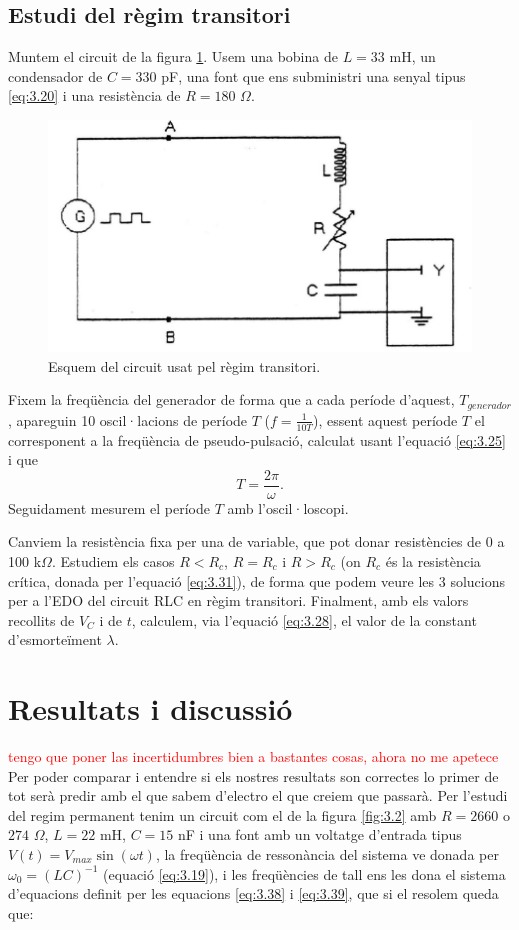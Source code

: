 \documentclass[a4paper,10.5pt]{report}
\begin{document}
\subsection{Estudi del règim transitori} \label{sec 3.2.2}
Muntem el circuit de la figura \ref{fig:3.3}. Usem una bobina de $L = 33$ mH, un condensador de $C = 330$ pF, una font que ens subministri una senyal tipus \eqref{eq:3.20} i una resistència de $R = 180$ $\Omega$.

\begin{figure}[h]
	\centering
	\includegraphics[width=0.3\linewidth]{screenshot006}
	\caption{Esquem del circuit usat pel règim transitori.}
	\label{fig:3.3}
\end{figure}

Fixem la freqüència del generador de forma que a cada període d'aquest, $T_{generador}$, apareguin 10 oscil·lacions de període $T$ ($f = \frac{1}{10T}$), essent aquest període $T$ el corresponent a la freqüència de pseudo-pulsació, calculat usant l'equació \eqref{eq:3.25} i que
\begin{equation}
	T = \frac{2\pi}{\omega}.
\end{equation}
Seguidament mesurem el període $T$ amb l'oscil·loscopi. 

Canviem la resistència fixa per una de variable, que pot donar resistències de 0 a 100 k$\Omega$. Estudiem els casos $R<R_c$, $R=R_c$ i $R>R_c$ (on $R_c$ és la resistència crítica, donada per l'equació \eqref{eq:3.31}), de forma que podem veure les 3 solucions per a l'EDO del circuit RLC en règim transitori. Finalment, amb els valors recollits de $V_C$ i de $t$, calculem, via l'equació \eqref{eq:3.28}, el valor de la constant d'esmorteïment $\lambda$.


\section{Resultats i discussió}
\textcolor{red}{tengo que poner las incertidumbres bien a bastantes cosas, ahora no me apetece}\\
Per poder comparar i entendre si els nostres resultats son correctes lo primer de tot serà predir amb el que sabem d'electro el que creiem que passarà. Per l'estudi del regim permanent tenim un circuit com el de la figura \ref{fig:3.2} amb $R=2660$ o $274$ $\Omega$, $L=22$ mH, $C=15$ nF i una font amb un voltatge d'entrada tipus $V(t) = V_{max}\sin(\omega t)$, la freqüència de ressonància del sistema ve donada per $\omega_0 = (LC)^{-1}$ (equació \ref{eq:3.19}), i les freqüències de tall ens les dona el sistema d'equacions definit per les equacions \ref{eq:3.38} i \ref{eq:3.39}, que si el resolem queda que:
\end{document}
